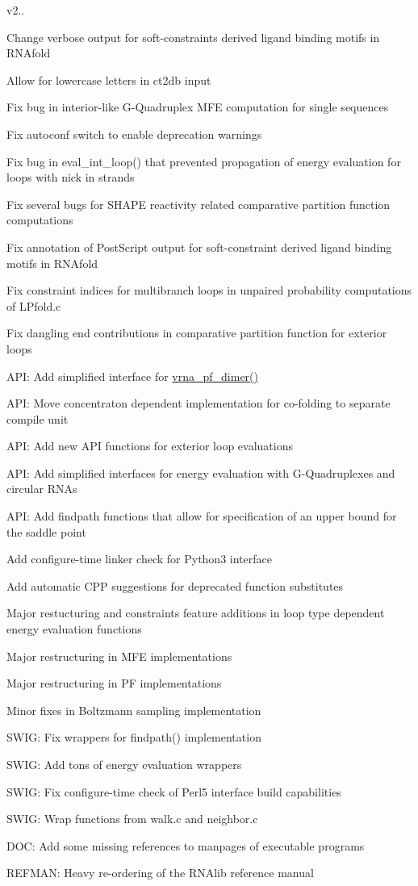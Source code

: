 v2..
\begin{DoxyItemize}
\item Change verbose output for soft-\/constraints derived ligand binding motifs in R\+N\+Afold
\item Allow for lowercase letters in ct2db input
\item Fix bug in interior-\/like G-\/\+Quadruplex M\+FE computation for single sequences
\item Fix autoconf switch to enable deprecation warnings
\item Fix bug in eval\+\_\+int\+\_\+loop() that prevented propagation of energy evaluation for loops with nick in strands
\item Fix several bugs for S\+H\+A\+PE reactivity related comparative partition function computations
\item Fix annotation of Post\+Script output for soft-\/constraint derived ligand binding motifs in R\+N\+Afold
\item Fix constraint indices for multibranch loops in unpaired probability computations of L\+Pfold.\+c
\item Fix dangling end contributions in comparative partition function for exterior loops
\item A\+PI\+: Add simplified interface for \mbox{\hyperlink{group__pf__cofold_ga4e5c7d06c302a7c59fc0d64dc142ca63}{vrna\+\_\+pf\+\_\+dimer()}}
\item A\+PI\+: Move concentraton dependent implementation for co-\/folding to separate compile unit
\item A\+PI\+: Add new A\+PI functions for exterior loop evaluations
\item A\+PI\+: Add simplified interfaces for energy evaluation with G-\/\+Quadruplexes and circular R\+N\+As
\item A\+PI\+: Add findpath functions that allow for specification of an upper bound for the saddle point
\item Add configure-\/time linker check for Python3 interface
\item Add automatic C\+PP suggestions for deprecated function substitutes
\item Major restucturing and constraints feature additions in loop type dependent energy evaluation functions
\item Major restructuring in M\+FE implementations
\item Major restructuring in PF implementations
\item Minor fixes in Boltzmann sampling implementation
\item S\+W\+IG\+: Fix wrappers for findpath() implementation
\item S\+W\+IG\+: Add tons of energy evaluation wrappers
\item S\+W\+IG\+: Fix configure-\/time check of Perl5 interface build capabilities
\item S\+W\+IG\+: Wrap functions from walk.\+c and neighbor.\+c
\item D\+OC\+: Add some missing references to manpages of executable programs
\item R\+E\+F\+M\+AN\+: Heavy re-\/ordering of the R\+N\+Alib reference manual
\end{DoxyItemize}

